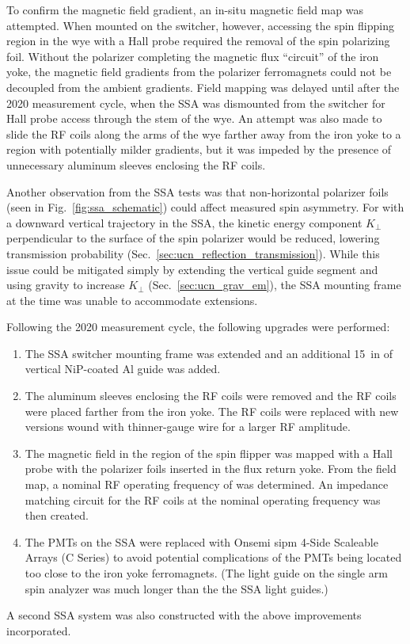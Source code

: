 To confirm the magnetic field gradient, an in-situ magnetic field map was attempted. When mounted on the switcher, however, accessing the spin flipping region in the wye with a Hall probe required the removal of the spin polarizing foil. Without the polarizer completing the magnetic flux ``circuit'' of the iron yoke, the magnetic field gradients from the polarizer ferromagnets could not be decoupled from the ambient gradients. Field mapping was delayed until after the 2020 measurement cycle, when the SSA was dismounted from the switcher for Hall probe access through the stem of the wye. An attempt was also made to slide the RF coils along the arms of the wye farther away from the iron yoke to a region with potentially milder gradients, but it was impeded by the presence of unnecessary aluminum sleeves enclosing the RF coils.

Another observation from the SSA tests was that non-horizontal polarizer foils (seen in Fig.~\ref{fig:ssa_schematic}) could affect measured spin asymmetry. For \ucn with a downward vertical trajectory in the SSA, the kinetic energy component $K_\perp$ perpendicular to the surface of the spin polarizer would be reduced, lowering transmission probability (Sec.~\ref{sec:ucn_reflection_transmission}). While this issue could be mitigated simply by extending the vertical guide segment and using gravity to increase $K_\perp$ (Sec.~\ref{sec:ucn_grav_em}), the SSA mounting frame at the time was unable to accommodate extensions.

Following the 2020 measurement cycle, the following upgrades were performed:
%
\begin{enumerate}
    \item The SSA switcher mounting frame was extended and an additional \qty{15}{in} of vertical NiP-coated Al guide was added.
    \item The aluminum sleeves enclosing the RF coils were removed and the RF coils were placed farther from the iron yoke. The RF coils were replaced with new versions wound with thinner-gauge wire for a larger RF amplitude.
    \item The magnetic field in the region of the spin flipper was mapped with a Hall probe with the polarizer foils inserted in the flux return yoke. From the field map, a nominal RF operating frequency of  was determined. An impedance matching circuit for the RF coils at the nominal operating frequency was then created.
    \item The PMTs on the SSA were replaced with Onsemi \acrshort{sipm} 4-Side Scaleable Arrays (C Series) to avoid potential complications of the PMTs being located too close to the iron yoke ferromagnets. (The light guide on the single arm spin analyzer was much longer than the the SSA light guides.)
\end{enumerate}
%
A second SSA system was also constructed with the above improvements incorporated.
